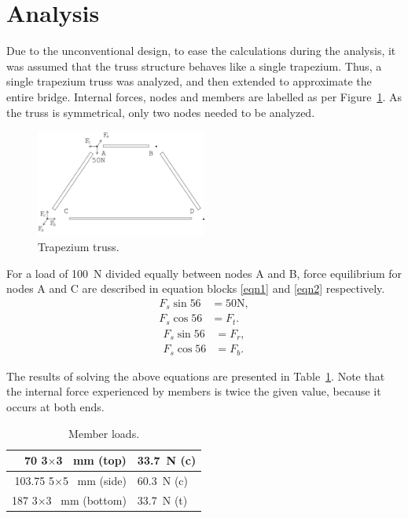 \documentclass[12pt]{article}
\begin{document}
	\section{Analysis}
		Due to the unconventional design, to ease the calculations during the analysis, it was assumed that the truss structure behaves like a single trapezium. Thus, a single trapezium truss was analyzed, and then extended to approximate the entire bridge. Internal forces, nodes and members are labelled as per Figure~\ref{trap}. As the truss is symmetrical, only two nodes needed to be analyzed.
		\begin{figure}[h!]
			\centering
			\includegraphics[width=0.5\textwidth]{trapanal}
			\caption{Trapezium truss.}
			\label{trap}
		\end{figure}
		For a load of 100~N divided equally between nodes A and B, force equilibrium for nodes A and C are described in equation blocks \ref{eqn1} and \ref{eqn2} respectively.
		\begin{subequations}
			\begin{align}
				F_s \sin 56&=50\mathrm{N}, \\
				F_s \cos 56&=F_t.
			\end{align} \label{eqn1}
		\end{subequations}
		\begin{subequations}
			\begin{align}
				F_s \sin 56&=F_r, \\ 
				F_s \cos 56&=F_b.
			\end{align} \label{eqn2}
		\end{subequations}

		The results of solving the above equations are presented in Table~\ref{loads}. Note that the internal force experienced by members is twice the given value, because it occurs at both ends.
		\begin{table}[h!]
			\caption{Member loads.}
			\begin{center}
			\begin{tabular}{ | r | l | }
				\hline
				70 3$\times$3 ~mm (top) & 33.7~N (c) \\ \hline
				103.75 5$\times$5 ~mm (side) & 60.3~N (c) \\ \hline
				187 3$\times$3 ~mm (bottom) & 33.7~N (t) \\ \hline
			\end{tabular}
			\end{center}
			\label{loads}
		\end{table}
\end{document}
